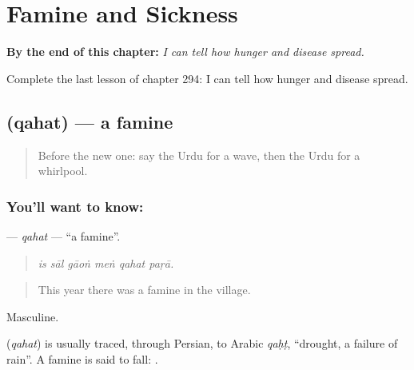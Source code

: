 
\chapter{Famine and Sickness}
\label{ch:ur-famine-and-sickness}

\begin{chapteropening}
\textbf{By the end of this chapter:} \emph{I can tell how hunger and disease spread.}

Complete the last lesson of chapter 294: I can tell how hunger and disease spread.
\end{chapteropening}

\section[\texorpdfstring{\ur{قحط} (qahat)}{قحط (qahat)}]{ (qahat) — a famine}

\label{lesson:UR-C294-qahat}



\begin{quote}
Before the new one: say the Urdu for a wave, then the Urdu for a whirlpool.
\end{quote}

\subsection*{You'll want to know: }
\textbf{} — \emph{qahat} — \textquotedblleft{}a famine\textquotedblright{}.

\begin{quote}
     
\end{quote}

\begin{quote}
\emph{is sāl gāoṅ meṅ qahat paṛā.}
\end{quote}

\begin{quote}
This year there was a famine in the village.
\end{quote}

Masculine.

\begin{cousinweb}
\textbf{} (\emph{qahat}) is usually traced, through Persian, to Arabic \emph{qaḥṭ}, \textquotedblleft{}drought, a failure of rain\textquotedblright{}. A famine is said to fall: \textbf{ }.
\end{cousinweb}

